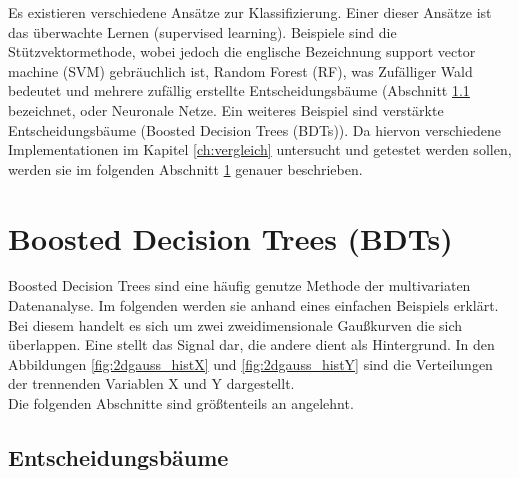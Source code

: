 Es existieren verschiedene Ans\"atze zur Klassifizierung. Einer dieser Ans\"atze ist das \"uberwachte Lernen (supervised learning). Beispiele sind die St\"utzvektormethode, wobei jedoch die englische Bezeichnung support vector machine (SVM) gebr\"auchlich ist, Random Forest (RF), was Zuf\"alliger Wald bedeutet und mehrere zuf\"allig erstellte Entscheidungsb\"aume (Abschnitt \ref{ch:Algorithmen:subsec:Entscheidungsbaum} bezeichnet, oder Neuronale Netze. Ein weiteres Beispiel sind verst\"arkte Entscheidungsb\"aume (Boosted Decision Trees (BDTs)). Da hiervon verschiedene Implementationen im Kapitel \ref{ch:vergleich} untersucht und getestet werden sollen, werden sie im folgenden Abschnitt \ref{ch:Algorithmen:sec:BDT} genauer beschrieben.

\section{Boosted Decision Trees (BDTs)}
\label{ch:Algorithmen:sec:BDT}

Boosted Decision Trees sind eine h\"aufig genutze Methode der multivariaten Datenanalyse. Im folgenden werden sie anhand eines einfachen Beispiels erkl\"art. Bei diesem handelt es sich um zwei zweidimensionale Gau\ss kurven die sich \"uberlappen. Eine stellt das Signal dar, die andere dient als Hintergrund. In den Abbildungen \ref{fig:2dgauss_histX} und \ref{fig:2dgauss_histY} sind die Verteilungen der trennenden Variablen X und Y dargestellt.\\
Die folgenden Abschnitte sind gr\"o\ss tenteils an \cite{SWB-307748006} angelehnt.

\subsection{Entscheidungsb\"aume}
\label{ch:Algorithmen:subsec:Entscheidungsbaum}

